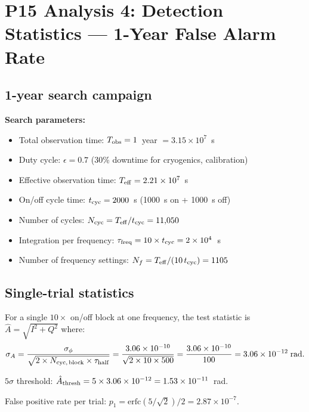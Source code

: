 \documentclass[11pt]{article}
\newcommand{\ee}[1]{\times 10^{#1}}
\begin{document}
\section{P15 Analysis 4: Detection Statistics --- 1-Year False Alarm Rate}
\label{sec:false-alarm}

\subsection{1-year search campaign}

\textbf{Search parameters:}
\begin{itemize}[nosep]
\item Total observation time: $T_{\rm obs} = 1$~year $= 3.15\ee{7}$~s
\item Duty cycle: $\epsilon = 0.7$ (30\% downtime for cryogenics,
calibration)
\item Effective observation time: $T_{\rm eff} = 2.21\ee{7}$~s
\item On/off cycle time: $t_{\rm cyc} = 2000$~s (1000~s on + 1000~s off)
\item Number of cycles: $N_{\rm cyc} = T_{\rm eff}/t_{\rm cyc} = 11{,}050$
\item Integration per frequency: $\tau_{\rm freq} = 10 \times t_{\rm cyc}
= 2\ee{4}$~s
\item Number of frequency settings: $N_f = T_{\rm eff}/(10\,t_{\rm cyc})
= 1105$
\end{itemize}

\subsection{Single-trial statistics}

For a single $10\times$ on/off block at one frequency, the test
statistic is $\hat{A} = \sqrt{I^2 + Q^2}$ where:
\begin{equation}
\sigma_A = \frac{\sigma_\phi}{\sqrt{2 \times N_{\rm cyc,\,block}
\times \tau_{\rm half}}} = \frac{3.06\ee{-10}}{\sqrt{2 \times 10
\times 500}} = \frac{3.06\ee{-10}}{100} = 3.06\ee{-12}\;\text{rad}.
\end{equation}

$5\sigma$ threshold: $\hat{A}_{\rm thresh} = 5 \times 3.06\ee{-12}
= 1.53\ee{-11}$~rad.

False positive rate per trial:
$p_1 = \text{erfc}(5/\sqrt{2})/2 = 2.87\ee{-7}$.
\end{document}
